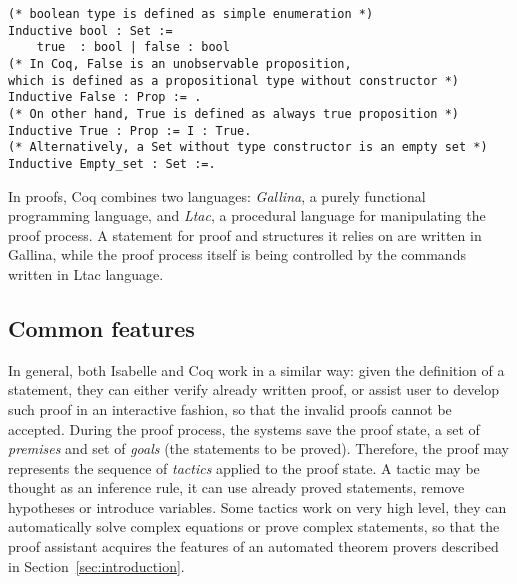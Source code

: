 \documentclass[article]{aaltoseries}
\begin{document}
\begin{lstlisting}[language=coq,
    caption={Basic types definitions in Coq},
    label={ex_typedefs_coq}]
(* boolean type is defined as simple enumeration *)
Inductive bool : Set :=
    true  : bool | false : bool
(* In Coq, False is an unobservable proposition,
which is defined as a propositional type without constructor *)
Inductive False : Prop := .
(* On other hand, True is defined as always true proposition *)
Inductive True : Prop := I : True.
(* Alternatively, a Set without type constructor is an empty set *)
Inductive Empty_set : Set :=.
\end{lstlisting}

In proofs, Coq combines two languages: \textit{Gallina}, a purely functional programming language, and \textit{Ltac}, a procedural language for manipulating the proof process. A statement for proof and structures it relies on are written in Gallina, while the proof process itself is being controlled by the commands written in Ltac language.




\subsection{Common features}

In general, both Isabelle and Coq work in a similar way: given the definition of a statement, they can either verify already written proof, or assist user to develop such proof in an interactive fashion, so that the invalid proofs cannot be accepted.
During the proof process, the systems save the proof state, a set of \textit{premises} and set of \textit{goals} (the statements to be proved). Therefore, the proof may represents the sequence of \textit{tactics} applied to the proof state. A tactic may be thought as an inference rule, it can use already proved statements, remove hypotheses or introduce variables. Some tactics work on very high level, they can automatically solve complex equations or prove complex statements, so that the proof assistant acquires the features of an automated theorem provers described in Section~\ref{sec:introduction}.
\end{document}
